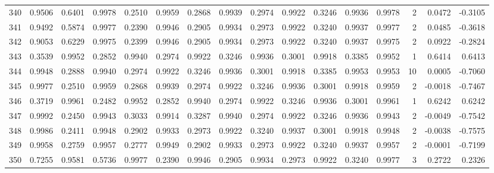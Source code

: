 \begin{tabular}{lrrrrrrrrrrrrrrr}
340 &      0.9506 &  0.6401 &  0.9978 &  0.2510 &  0.9959 &  0.2868 &  0.9939 &  0.2974 &  0.9922 &  0.3246 &   0.9936 &     0.9978 &      2 &                    0.0472 &                    -0.3105 \\
341 &      0.9492 &  0.5874 &  0.9977 &  0.2390 &  0.9946 &  0.2905 &  0.9934 &  0.2973 &  0.9922 &  0.3240 &   0.9937 &     0.9977 &      2 &                    0.0485 &                    -0.3618 \\
342 &      0.9053 &  0.6229 &  0.9975 &  0.2399 &  0.9946 &  0.2905 &  0.9934 &  0.2973 &  0.9922 &  0.3240 &   0.9937 &     0.9975 &      2 &                    0.0922 &                    -0.2824 \\
343 &      0.3539 &  0.9952 &  0.2852 &  0.9940 &  0.2974 &  0.9922 &  0.3246 &  0.9936 &  0.3001 &  0.9918 &   0.3385 &     0.9952 &      1 &                    0.6414 &                     0.6413 \\
344 &      0.9948 &  0.2888 &  0.9940 &  0.2974 &  0.9922 &  0.3246 &  0.9936 &  0.3001 &  0.9918 &  0.3385 &   0.9953 &     0.9953 &     10 &                    0.0005 &                    -0.7060 \\
345 &      0.9977 &  0.2510 &  0.9959 &  0.2868 &  0.9939 &  0.2974 &  0.9922 &  0.3246 &  0.9936 &  0.3001 &   0.9918 &     0.9959 &      2 &                   -0.0018 &                    -0.7467 \\
346 &      0.3719 &  0.9961 &  0.2482 &  0.9952 &  0.2852 &  0.9940 &  0.2974 &  0.9922 &  0.3246 &  0.9936 &   0.3001 &     0.9961 &      1 &                    0.6242 &                     0.6242 \\
347 &      0.9992 &  0.2450 &  0.9943 &  0.3033 &  0.9914 &  0.3287 &  0.9940 &  0.2974 &  0.9922 &  0.3246 &   0.9936 &     0.9943 &      2 &                   -0.0049 &                    -0.7542 \\
348 &      0.9986 &  0.2411 &  0.9948 &  0.2902 &  0.9933 &  0.2973 &  0.9922 &  0.3240 &  0.9937 &  0.3001 &   0.9918 &     0.9948 &      2 &                   -0.0038 &                    -0.7575 \\
349 &      0.9958 &  0.2759 &  0.9957 &  0.2777 &  0.9949 &  0.2902 &  0.9933 &  0.2973 &  0.9922 &  0.3240 &   0.9937 &     0.9957 &      2 &                   -0.0001 &                    -0.7199 \\
350 &      0.7255 &  0.9581 &  0.5736 &  0.9977 &  0.2390 &  0.9946 &  0.2905 &  0.9934 &  0.2973 &  0.9922 &   0.3240 &     0.9977 &      3 &                    0.2722 &                     0.2326 \\

\end{tabular}
